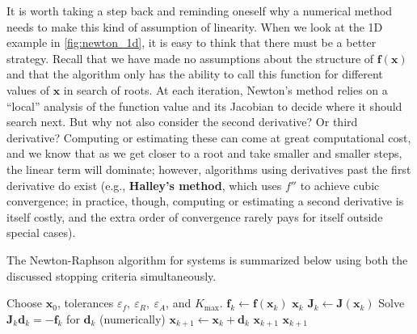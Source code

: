 It is worth taking a step back and reminding oneself why a numerical method needs to make this kind of assumption of linearity. When we look at the 1D example in \autoref{fig:newton_1d}, it is easy to think that there must be a better strategy. Recall that we have made no assumptions about the structure of $\mathbf f(\mathbf x)$ and that the algorithm only has the ability to call this function for different values of $\mathbf x$ in search of roots. At each iteration, Newton's method relies on a ``local'' analysis of the function value and its Jacobian to decide where it should search next. But why not also consider the second derivative? Or third derivative? Computing or estimating these can come at great computational cost, and we know that as we get closer to a root and take smaller and smaller steps, the linear term will dominate; however, algorithms using derivatives past the first derivative do exist (e.g., \textbf{Halley's method}, which uses $f''$ to achieve cubic convergence; in practice, though, computing or estimating a second derivative is itself costly, and the extra order of convergence rarely pays for itself outside special cases).


The Newton-Raphson algorithm for systems is summarized below using both the discussed stopping criteria simultaneously.

\begin{algorithm}[H]
    \caption{Newton's Method for Systems (robust variant)}
    \begin{algorithmic}[1]
    \State Choose $\mathbf{x}_0$, tolerances $\varepsilon_f,\ \varepsilon_R,\ \varepsilon_A$, and $K_{\max}$.
        \State $\mathbf{f}_k \gets \mathbf{f}(\mathbf{x}_k)$
            \State \Return $\mathbf{x}_k$ 
        \EndIf
        \State $\mathbf{J}_k \gets \mathbf{J}(\mathbf{x}_k)$
        \State Solve $\mathbf{J}_k \mathbf{d}_k = -\mathbf{f}_k$ for $\mathbf{d}_k$ (numerically)
        \State $\mathbf{x}_{k+1} \gets \mathbf{x}_k + \mathbf{d}_k$
            \State \Return $\mathbf{x}_{k+1}$ 
        \EndIf
    \EndFor
    \State \Return $\mathbf{x}_{k+1}$ 
    \end{algorithmic}
\end{algorithm}

